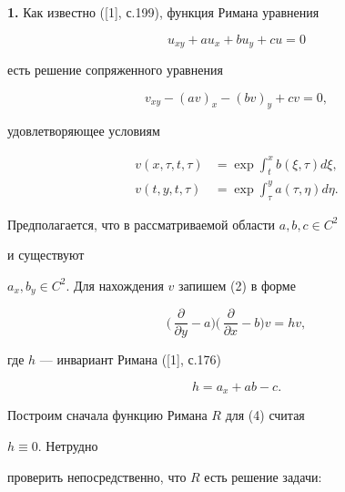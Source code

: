 {\bf 1.} Как известно ([1], с.199), функция Римана уравнения


\begin{equation}


u_{xy}+au_x+bu_y+cu=0


\end{equation}


есть решение сопряженного уравнения


\begin{equation}


v_{xy}-(av)_x-(bv)_y+cv=0,


\end{equation}


удовлетворяющее условиям


\begin{equation}


\begin{split}


v(x,\tau,t,\tau)&=\exp\int^x_t b(\xi,\tau)d\xi,\\


v(t,y,t,\tau)&=\exp\int^y_\tau a(\tau,\eta)d\eta.


\end{split}


\end{equation}


Предполагается, что в рассматриваемой области $a,b,c\in C^2$


и существуют


$a_x,b_y\in C^2$. Для нахождения $v$ запишем (2) в форме


\begin{equation}


\biggl(\,\frac{\partial}{\partial y}-a\biggr)


\biggl(\,\frac{\partial}{\partial x}-b\biggr)v=hv,


\end{equation}


где $h$ --- инвариант Римана ([1], с.176)


\begin{equation}


h=a_x+ab-c.


\end{equation}


Построим сначала функцию Римана $R$ для (4) считая


$h\equiv 0$. Нетрудно


проверить непосредственно, что $R$ есть решение задачи:


